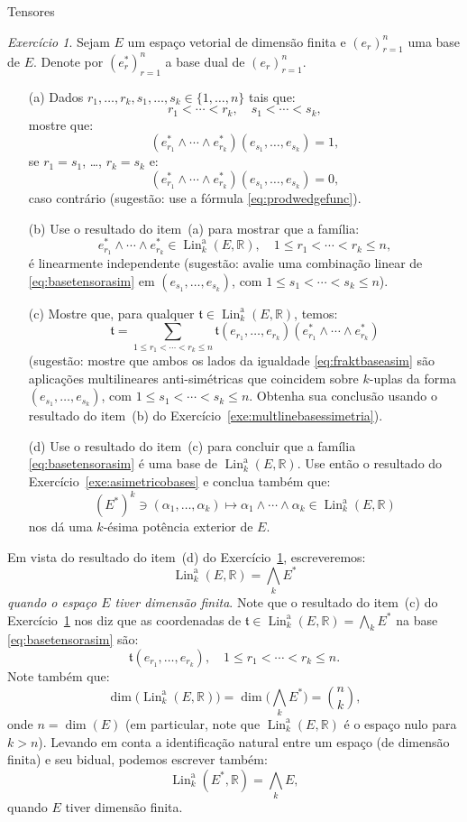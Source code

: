 \documentclass[oneside,11pt]{amsart}
\newcommand{\R}{\mathds R}
\DeclareMathOperator{\Lin}{Lin}
\DeclareMathOperator{\Dim}{dim}
\theoremstyle{remark}\newtheorem{exercise}{Exercício}[section]
\theoremstyle{plain}\newtheorem{teo}{Teorema}[section]
\theoremstyle{plain}\newtheorem{lem}[teo]{Lema}
\theoremstyle{plain}\newtheorem{prop}[teo]{Proposição}
\theoremstyle{definition}\newtheorem{defin}[teo]{Definição}
\theoremstyle{remark}\newtheorem{rem}[teo]{Observação}
\theoremstyle{definition}\newtheorem{example}[teo]{Exemplo}
\numberwithin{equation}{section}
\begin{document}
\begin{section}{Tensores}
\begin{exercise}\label{exe:Linabigwedge}
Sejam $E$ um espaço vetorial de dimensão finita e $(e_r)_{r=1}^n$ uma base de $E$. Denote por $(e_r^*)_{r=1}^n$ a base dual de $(e_r)_{r=1}^n$.
\begin{itemize}
\item[(a)] Dados $r_1,\ldots,r_k,s_1,\ldots,s_k\in\{1,\ldots,n\}$ tais que:
\[r_1<\cdots<r_k,\quad s_1<\cdots<s_k,\]
mostre que:
\[(e_{r_1}^*\wedge\cdots\wedge e_{r_k}^*)(e_{s_1},\ldots,e_{s_k})=1,\]
se $r_1=s_1$, \dots, $r_k=s_k$ e:
\[(e_{r_1}^*\wedge\cdots\wedge e_{r_k}^*)(e_{s_1},\ldots,e_{s_k})=0,\]
caso contrário (sugestão: use a fórmula \eqref{eq:prodwedgefunc}).
\item[(b)] Use o resultado do item~(a) para mostrar que a família:
\begin{equation}\label{eq:basetensorasim}
e_{r_1}^*\wedge\cdots\wedge e_{r_k}^*\in\Lin_k^{\mathrm a}(E,\R),\quad1\le r_1<\cdots<r_k\le n,
\end{equation}
é linearmente independente (sugestão: avalie uma combinação linear de \eqref{eq:basetensorasim} em $(e_{s_1},\ldots,e_{s_k})$, com $1\le s_1<\cdots<s_k\le n$).
\item[(c)] Mostre que, para qualquer $\mathfrak t\in\Lin_k^{\mathrm a}(E,\R)$, temos:
\begin{equation}\label{eq:fraktbaseasim}
\mathfrak t=\sum_{1\le r_1<\cdots<r_k\le n}\mathfrak t(e_{r_1},\ldots,e_{r_k})(e_{r_1}^*\wedge\cdots\wedge e_{r_k}^*)
\end{equation}
(sugestão: mostre que ambos os lados da igualdade \eqref{eq:fraktbaseasim} são aplicações multilineares anti-si\-mé\-tri\-cas que coincidem
sobre $k$-uplas da forma $(e_{s_1},\ldots,e_{s_k})$, com $1\le s_1<\cdots<s_k\le n$. Obtenha sua conclusão usando o resultado do item~(b) do
Exercício~\ref{exe:multlinebasessimetria}).
\item[(d)] Use o resultado do item~(c) para concluir que a família \eqref{eq:basetensorasim} é uma base de $\Lin_k^{\mathrm a}(E,\R)$. Use então o resultado
do Exercício~\ref{exe:asimetricobases} e conclua também que:
\[(E^*)^k\ni(\alpha_1,\ldots,\alpha_k)\longmapsto\alpha_1\wedge\cdots\wedge\alpha_k\in\Lin_k^{\mathrm a}(E,\R)\]
nos dá uma $k$-ésima potência exterior de $E$.
\end{itemize}
\end{exercise}

Em vista do resultado do item~(d) do Exercício~\ref{exe:Linabigwedge}, escreveremos:
\[\Lin_k^{\mathrm a}(E,\R)=\bigwedge_kE^*\]
{\em quando o espaço $E$ tiver dimensão finita}. Note que o resultado do item~(c) do Exercício~\ref{exe:Linabigwedge}
nos diz que as coordenadas de $\mathfrak t\in\Lin_k^{\mathrm a}(E,\R)=\bigwedge_kE^*$ na base \eqref{eq:basetensorasim} são:
\[\mathfrak t(e_{r_1},\ldots,e_{r_k}),\quad1\le r_1<\cdots<r_k\le n.\]
Note também que:
\[\Dim\!\big(\!\Lin_k^{\mathrm a}(E,\R)\big)=\Dim\!\Big(\bigwedge_kE^*\Big)=\binom nk,\]
onde $n=\Dim(E)$ (em particular, note que $\Lin_k^{\mathrm a}(E,\R)$ é o espaço nulo para $k>n$).
Levando em conta a identificação natural entre um espaço (de dimensão finita) e seu bidual, podemos escrever também:
\[\Lin_k^{\mathrm a}(E^*,\R)=\bigwedge_kE,\]
quando $E$ tiver dimensão finita.


\end{section}
\end{document}
